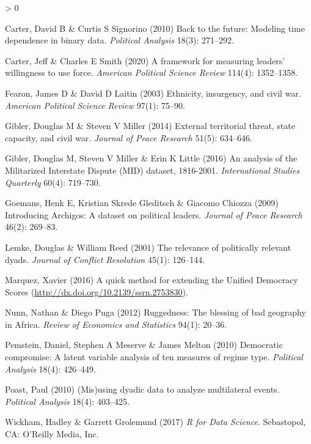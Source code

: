 \documentclass[
  11pt,
]{article}
\newlength{\cslhangindent}
\newenvironment{CSLReferences}[2] %
 {%
  \setlength{\parindent}{0pt}
  \ifodd #1 \everypar{\setlength{\hangindent}{\cslhangindent}}\ignorespaces\fi
  \ifnum #2 > 0
  \setlength{\parskip}{#2\baselineskip}
  \fi
 }%
 {}
\begin{document}
\begin{CSLReferences}{1}{0}
\leavevmode\hypertarget{ref-cartersignorino2010bf}{}%
Carter, David B \& Curtis S Signorino (2010) Back to the future: Modeling time dependence in binary data. \emph{Political Analysis} 18(3): 271--292.

\leavevmode\hypertarget{ref-cartersmith2020fml}{}%
Carter, Jeff \& Charles E Smith (2020) A framework for measuring leaders' willingness to use force. \emph{American Political Science Review} 114(4): 1352--1358.

\leavevmode\hypertarget{ref-fearonlaitin2003eicw}{}%
Fearon, James D \& David D Laitin (2003) Ethnicity, insurgency, and civil war. \emph{American Political Science Review} 97(1): 75--90.

\leavevmode\hypertarget{ref-giblermiller2014etts}{}%
Gibler, Douglas M \& Steven V Miller (2014) External territorial threat, state capacity, and civil war. \emph{Journal of Peace Research} 51(5): 634--646.

\leavevmode\hypertarget{ref-gibleretal2016amid}{}%
Gibler, Douglas M, Steven V Miller \& Erin K Little (2016) An analysis of the {M}ilitarized {I}nterstate {D}ispute {(MID)} dataset, 1816-2001. \emph{International Studies Quarterly} 60(4): 719--730.

\leavevmode\hypertarget{ref-goemansetal2009ia}{}%
Goemans, Henk E, Kristian Skrede Gleditsch \& Giacomo Chiozza (2009) Introducing {A}rchigos: A dataset on political leaders. \emph{Journal of Peace Research} 46(2): 269--83.

\leavevmode\hypertarget{ref-lemkereed2001rprd}{}%
Lemke, Douglas \& William Reed (2001) The relevance of politically relevant dyads. \emph{Journal of Conflict Resolution} 45(1): 126--144.

\leavevmode\hypertarget{ref-marquez2016qme}{}%
Marquez, Xavier (2016) A quick method for extending the {U}nified {D}emocracy {S}cores (\url{http://dx.doi.org/10.2139/ssrn.2753830}).

\leavevmode\hypertarget{ref-nunnpuga2012r}{}%
Nunn, Nathan \& Diego Puga (2012) Ruggedness: The blessing of bad geography in {A}frica. \emph{Review of Economics and Statistics} 94(1): 20--36.

\leavevmode\hypertarget{ref-pemsteinetal2010dc}{}%
Pemstein, Daniel, Stephen A Meserve \& James Melton (2010) Democratic compromise: A latent variable analysis of ten measures of regime type. \emph{Political Analysis} 18(4): 426--449.

\leavevmode\hypertarget{ref-poast2010mdd}{}%
Poast, Paul (2010) (Mis)using dyadic data to analyze multilateral events. \emph{Political Analysis} 18(4): 403--425.

\leavevmode\hypertarget{ref-wickhamgrolemund2017rds}{}%
Wickham, Hadley \& Garrett Grolemund (2017) \emph{{R} for Data Science}. Sebastopol, CA: O'Reilly Media, Inc.

\end{CSLReferences}
\end{document}
